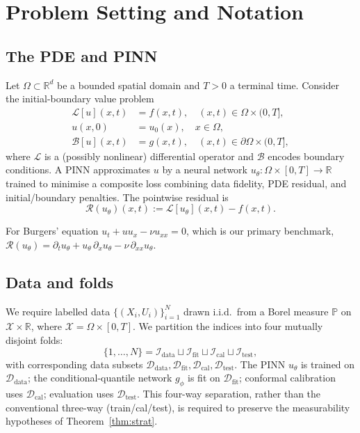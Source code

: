 \documentclass[11pt]{article}
\theoremstyle{definition}
\theoremstyle{remark}
\newcommand{\R}{\mathbb{R}}
\newcommand{\PP}{\mathbb{P}}
\newcommand{\Ddata}{\mathcal{D}_{\text{data}}}
\newcommand{\Dfit}{\mathcal{D}_{\text{fit}}}
\newcommand{\Dcal}{\mathcal{D}_{\text{cal}}}
\newcommand{\Dtest}{\mathcal{D}_{\text{test}}}
\newcommand{\Rop}{\mathcal{R}}
\begin{document}
\section{Problem Setting and Notation}
\label{sec:setting}

\subsection{The PDE and PINN}

Let $\Omega \subset \R^d$ be a bounded spatial domain and $T > 0$ a terminal time. Consider the initial-boundary value problem
\begin{align}
    \mathcal{L}[u](x,t) &= f(x,t), \quad (x,t) \in \Omega \times (0,T], \label{eq:pde}\\
    u(x,0) &= u_0(x), \quad x \in \Omega, \\
    \mathcal{B}[u](x,t) &= g(x,t), \quad (x,t) \in \partial\Omega \times (0,T],
\end{align}
where $\mathcal{L}$ is a (possibly nonlinear) differential operator and $\mathcal{B}$ encodes boundary conditions. A PINN approximates $u$ by a neural network $u_\theta: \Omega \times [0,T] \to \R$ trained to minimise a composite loss combining data fidelity, PDE residual, and initial/boundary penalties. The pointwise residual is
\begin{equation}
    \Rop(u_\theta)(x,t) := \mathcal{L}[u_\theta](x,t) - f(x,t).
    \label{eq:residual}
\end{equation}

For Burgers' equation $u_t + uu_x - \nu u_{xx} = 0$, which is our primary benchmark, $\Rop(u_\theta) = \partial_t u_\theta + u_\theta\, \partial_x u_\theta - \nu\, \partial_{xx} u_\theta$.

\subsection{Data and folds}

We require labelled data $\{(X_i, U_i)\}_{i=1}^N$ drawn i.i.d.\ from a Borel measure $\PP$ on $\mathcal{X} \times \R$, where $\mathcal{X} = \Omega \times [0,T]$. We partition the indices into four mutually disjoint folds:
\begin{equation}
    \{1,\dots,N\} = \mathcal{I}_{\text{data}} \sqcup \mathcal{I}_{\text{fit}} \sqcup \mathcal{I}_{\text{cal}} \sqcup \mathcal{I}_{\text{test}},
\end{equation}
with corresponding data subsets $\Ddata, \Dfit, \Dcal, \Dtest$. The PINN $u_\theta$ is trained on $\Ddata$; the conditional-quantile network $g_\phi$ is fit on $\Dfit$; conformal calibration uses $\Dcal$; evaluation uses $\Dtest$. This four-way separation, rather than the conventional three-way (train/cal/test), is required to preserve the measurability hypotheses of Theorem~\ref{thm:strat}.
\end{document}

